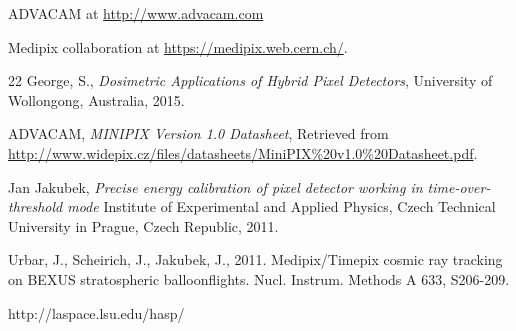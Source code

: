 \begin{thebibliography}{00}
  ADVACAM at \url{http://www.advacam.com}

  Medipix collaboration at \url{https://medipix.web.cern.ch/}.
  
 22
  George, S., \textit{Dosimetric Applications of Hybrid Pixel Detectors}, University of Wollongong, Australia, 2015.

  ADVACAM, \textit{MINIPIX Version 1.0 Datasheet}, Retrieved from \url{http://www.widepix.cz/files/datasheets/MiniPIX\%20v1.0\%20Datasheet.pdf}.

  Jan Jakubek, \textit{Precise energy calibration of pixel detector working in time-over-threshold mode} Institute of Experimental and Applied Physics, Czech Technical University in Prague, Czech Republic, 2011.

Urbar, J., Scheirich, J., Jakubek, J., 2011. Medipix/Timepix cosmic ray tracking on BEXUS stratospheric balloonflights. Nucl. Instrum. Methods A 633, S206-209.
  
http://laspace.lsu.edu/hasp/
\end{thebibliography}
